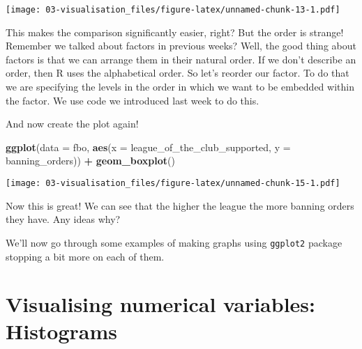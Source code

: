 \documentclass[
]{book}
\newenvironment{Shaded}{\begin{snugshade}}{\end{snugshade}}
\newcommand{\AttributeTok}[1]{\textcolor[rgb]{0.13,0.29,0.53}{#1}}
\newcommand{\FunctionTok}[1]{\textcolor[rgb]{0.13,0.29,0.53}{\textbf{#1}}}
\newcommand{\NormalTok}[1]{#1}
\newcommand{\OtherTok}[1]{\textcolor[rgb]{0.56,0.35,0.01}{#1}}
\newcommand{\SpecialCharTok}[1]{\textcolor[rgb]{0.81,0.36,0.00}{\textbf{#1}}}
\newcommand{\StringTok}[1]{\textcolor[rgb]{0.31,0.60,0.02}{#1}}
\begin{document}
\texttt{[image: 03-visualisation\_files/figure-latex/unnamed-chunk-13-1.pdf]}

This makes the comparison significantly easier, right? But the order is strange! Remember we talked about factors in previous weeks? Well, the good thing about factors is that we can arrange them in their natural order. If we don't describe an order, then R uses the alphabetical order. So let's reorder our factor. To do that we are specifying the levels in the order in which we want to be embedded within the factor. We use code we introduced last week to do this.

\begin{Shaded}
\end{Shaded}

And now create the plot again!

\begin{Shaded}
\begin{Highlighting}[]
\FunctionTok{ggplot}\NormalTok{(}\AttributeTok{data =}\NormalTok{ fbo, }\FunctionTok{aes}\NormalTok{(}\AttributeTok{x =}\NormalTok{ league\_of\_the\_club\_supported, }\AttributeTok{y =}\NormalTok{ banning\_orders)) }\SpecialCharTok{+} 
  \FunctionTok{geom\_boxplot}\NormalTok{() }
\end{Highlighting}
\end{Shaded}

\texttt{[image: 03-visualisation\_files/figure-latex/unnamed-chunk-15-1.pdf]}

Now this is great! We can see that the higher the league the more banning orders they have. Any ideas why?

We'll now go through some examples of making graphs using \texttt{ggplot2} package stopping a bit more on each of them.

\section{Visualising numerical variables: Histograms}\label{visualising-numerical-variables-histograms}
\end{document}
